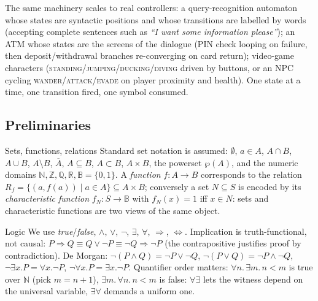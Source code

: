 The same machinery scales to real controllers: a query-recognition automaton whose states are syntactic positions and whose transitions are labelled by words (accepting complete sentences such as \emph{``I want some information please''}); an ATM whose states are the screens of the dialogue (PIN check looping on failure, then deposit/withdrawal branches re-converging on card return); video-game characters (\textsc{standing}/\textsc{jumping}/\textsc{ducking}/\textsc{diving} driven by buttons, or an NPC cycling \textsc{wander}/\textsc{attack}/\textsc{evade} on player proximity and health). One state at a time, one transition fired, one symbol consumed.

\subsection{Preliminaries}

\begin{definitionbox}{Sets, functions, relations}
Standard set notation is assumed: $\emptyset$, $a \in A$, $A \cap B$, $A \cup B$, $A \setminus B$, $\overline{A}$, $A \subseteq B$, $A \subset B$, $A \times B$, the powerset $\wp(A)$, and the numeric domains $\mathbb{N}, \mathbb{Z}, \mathbb{Q}, \mathbb{R}, \mathbb{B} = \{0,1\}$. A \emph{function} $f : A \to B$ corresponds to the relation $R_f = \{(a, f(a)) \mid a \in A\} \subseteq A \times B$; conversely a set $N \subseteq S$ is encoded by its \emph{characteristic function} $f_N : S \to \mathbb{B}$ with $f_N(x) = 1$ iff $x \in N$: sets and characteristic functions are two views of the same object.
\end{definitionbox}

\begin{definitionbox}{Logic}
We use \emph{true}/\emph{false}, $\wedge$, $\vee$, $\neg$, $\exists$, $\forall$, $\Rightarrow$, $\Leftrightarrow$. Implication is truth-functional, not causal: $P \Rightarrow Q \equiv Q \vee \neg P \equiv \neg Q \Rightarrow \neg P$ (the contrapositive justifies proof by contradiction). De Morgan: $\neg(P \wedge Q) = \neg P \vee \neg Q$, $\neg(P \vee Q) = \neg P \wedge \neg Q$, $\neg \exists x. P = \forall x. \neg P$, $\neg \forall x. P = \exists x. \neg P$. Quantifier order matters: $\forall n.\, \exists m.\, n < m$ is true over $\mathbb{N}$ (pick $m = n+1$), $\exists m.\, \forall n.\, n < m$ is false: $\forall\exists$ lets the witness depend on the universal variable, $\exists\forall$ demands a uniform one.
\end{definitionbox}

